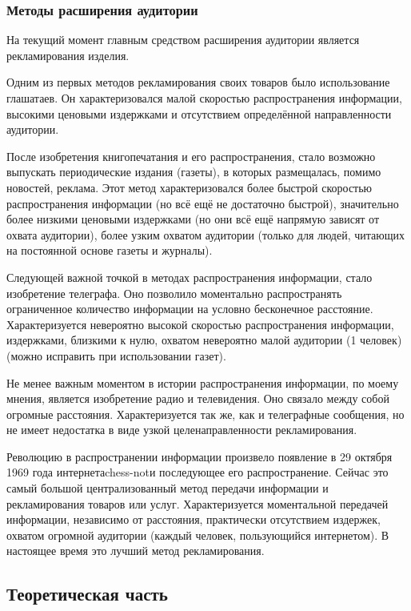 \subsubsection{Методы расширения аудитории}
На текущий момент главным средством расширения аудитории является
рекламирования изделия.

Одним из первых методов рекламирования своих товаров было использование
глашатаев. Он характеризовался малой скоростью распространения информации,
высокими ценовыми издержками и отсутствием определённой направленности
аудитории.

После изобретения книгопечатания и его распространения, стало возможно
выпускать периодические издания (газеты), в которых размещалась, помимо
новостей, реклама. Этот метод характеризовался более быстрой скоростью
распространения информации (но всё ещё не достаточно быстрой), значительно
более низкими ценовыми издержками (но они всё ещё напрямую зависят от охвата
аудитории), более узким охватом аудитории (только для людей, читающих на
постоянной основе газеты и журналы).

Следующей важной точкой в методах распространения информации, стало изобретение
телеграфа. Оно позволило моментально распространять ограниченное количество
информации на условно бесконечное расстояние. Характеризуется невероятно
высокой скоростью распространения информации, издержками, близкими к нулю,
охватом невероятно малой аудитории (1 человек) (можно исправить при
использовании газет).

Не менее важным моментом в истории распространения информации, по моему мнения,
является изобретение радио и телевидения. Оно связало между собой огромные
расстояния. Характеризуется так же, как и телеграфные сообщения, но не имеет
недостатка в виде узкой целенаправленности рекламирования.

Революцию в распространении информации произвело появление в 29 октября 1969
года интернета\gls{chess-not}и последующее его распространение. Сейчас это самый большой
централизованный метод передачи информации и рекламирования товаров или услуг.
Характеризуется моментальной передачей информации, независимо от расстояния,
практически отсутствием издержек, охватом огромной аудитории (каждый человек,
пользующийся интернетом). В настоящее время это лучший метод рекламирования.

\subsection{Теоретическая часть}
